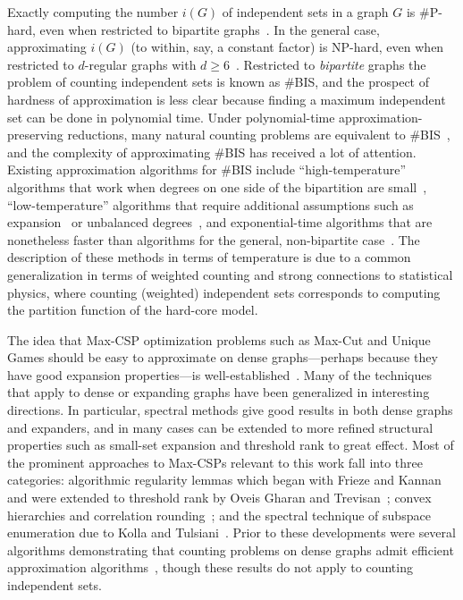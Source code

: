 \documentclass[11pt,letterpaper]{amsart}
\theoremstyle{definition}
\begin{document}
Exactly computing the number $i(G)$ of independent sets in a graph $G$ is \#P-hard, even when restricted to bipartite graphs~\cite{PB83}. In the general case, approximating $i(G)$ (to within, say, a constant factor) is NP-hard, even when restricted to $d$-regular graphs with $d\ge 6$~\cite{GGS+11,Sly10,SS12}.
Restricted to \emph{bipartite} graphs the problem of counting independent sets is known as \#BIS, and the prospect of hardness of approximation is less clear because finding a maximum independent set can be done in polynomial time.
Under polynomial-time approximation-preserving reductions, many natural counting problems are equivalent to \#BIS~\cite{DGGJ04}, and the complexity of approximating \#BIS has received a lot of attention. 
Existing approximation algorithms for \#BIS include ``high-temperature'' algorithms that work when degrees on one side of the bipartition are small~\cite{LL15}, ``low-temperature'' algorithms that require additional assumptions such as expansion~\cite{CGG+19,JKP19b} or unbalanced degrees~\cite{CPSODA}, and exponential-time algorithms that are nonetheless faster than algorithms for the general, non-bipartite case~\cite{GLR21}.
The description of these methods in terms of temperature is due to a common generalization in terms of weighted counting and strong connections to statistical physics, where counting (weighted) independent sets corresponds to computing the partition function of the hard-core model.

The idea that Max-CSP optimization problems such as Max-Cut and Unique Games should be easy to approximate on dense graphs---perhaps because they have good expansion properties---is well-established~\cite{AKK95,Fri96,FK96}.
Many of the techniques that apply to dense or expanding graphs have been generalized in interesting directions. 
In particular, spectral methods give good results in both dense graphs and expanders, and in many cases can be extended to more refined structural properties such as small-set expansion and threshold rank to great effect.
Most of the prominent approaches to Max-CSPs relevant to this work fall into three categories: algorithmic regularity lemmas which began with Frieze and Kannan~\cite{FK96} and were extended to threshold rank by Oveis Gharan and Trevisan~\cite{OT13a}; convex hierarchies and correlation rounding~\cite{AKK+08,BRS11a,GS11a}; and the spectral technique of subspace enumeration due to Kolla and Tulsiani~\cite{Kol10,KT07}. 
Prior to these developments were several algorithms demonstrating that counting problems on dense graphs admit efficient approximation algorithms~\cite{Ann94,DFJ94,JS89}, though these results do not apply to counting independent sets. 
\end{document}
